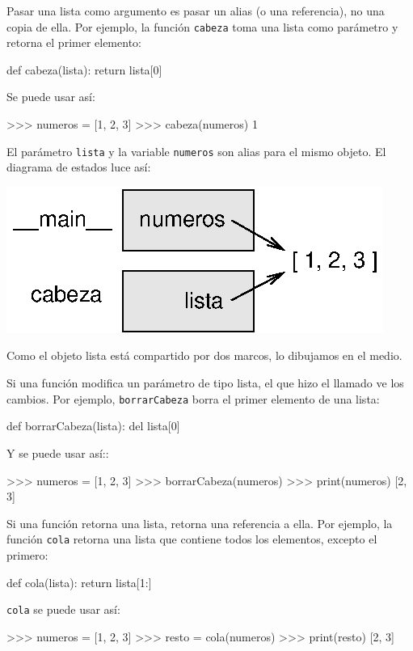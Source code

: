 Pasar una lista como argumento es pasar un alias (o una referencia),
no una copia de ella. Por ejemplo, la función \texttt{cabeza} toma
una lista como parámetro y retorna el primer elemento:
\begin{pythoncode}
def cabeza(lista):
  return lista[0]
\end{pythoncode}

Se puede usar así:
\begin{pyconcode}
>>> numeros = [1, 2, 3]
>>> cabeza(numeros)
1
\end{pyconcode}

El parámetro \texttt{lista} y la variable \texttt{numeros} son alias
para el mismo objeto. El diagrama de estados luce así:

\beforefig \centerline{\includegraphics{illustrations/stack5}}
\afterfig

Como el objeto lista está compartido por dos marcos, lo dibujamos
en el medio.

Si una función modifica un parámetro de tipo lista, el que hizo el
llamado ve los cambios. Por ejemplo, \texttt{borrarCabeza} borra el
primer elemento de una lista:
\begin{pythoncode}
def borrarCabeza(lista):
  del lista[0]
\end{pythoncode}

Y se puede usar así::
\begin{pyconcode}
>>> numeros = [1, 2, 3]
>>> borrarCabeza(numeros)
>>> print(numeros)
[2, 3]
\end{pyconcode}

Si una función retorna una lista, retorna una referencia a ella. Por
ejemplo, la función \texttt{cola} retorna una lista que contiene todos
los elementos, excepto el primero:
\begin{pythoncode}
def cola(lista):
  return lista[1:]
\end{pythoncode}

\texttt{cola} se puede usar así:
\begin{pyconcode}
>>> numeros = [1, 2, 3]
>>> resto = cola(numeros)
>>> print(resto)
[2, 3]
\end{pyconcode}

